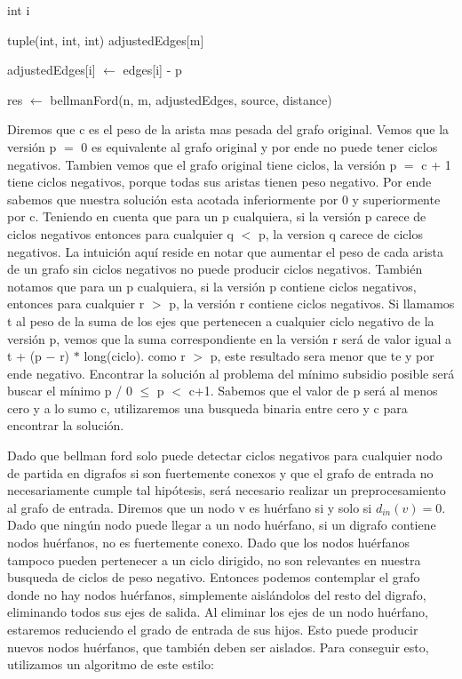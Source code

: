 \begin{algorithm}[H]
		\NoCaptionOfAlgo
		\caption{}
		
		int i
		
		tuple(int, int, int) adjustedEdges[m] 
		
		\For{i in [0..m)}
		{
			adjustedEdges[i] $\leftarrow$ edges[i] - p	
		}

		res $\leftarrow$ bellmanFord(n, m, adjustedEdges, source, distance)		

	\end{algorithm}

Diremos que c es el peso de la arista mas pesada del grafo original. Vemos que la versión p $=$ 0 es equivalente al grafo original y por ende no puede tener ciclos negativos. Tambien vemos que el grafo original tiene ciclos, la versión p $=$ c + 1 tiene ciclos negativos, porque todas sus aristas tienen peso negativo. Por ende sabemos que nuestra solución esta acotada inferiormente por 0 y superiormente por c. Teniendo en cuenta que para un p cualquiera, si la versión p carece de ciclos negativos entonces para cualquier q $<$ p, la version q carece de ciclos negativos. La intuición aquí reside en notar que aumentar el peso de cada arista de un grafo sin ciclos negativos no puede producir ciclos negativos. También notamos que para un p cualquiera, si la versión p contiene ciclos negativos, entonces para cualquier r $>$ p, la versión r contiene ciclos negativos. Si llamamos t al peso de la suma de los ejes que pertenecen a cualquier ciclo negativo de la versión p, vemos que la suma correspondiente en la versión r será de valor igual a t + (p $-$ r) $\ast$ long(ciclo). como r $>$ p, este resultado sera menor que te y por ende negativo. Encontrar la solución al problema del mínimo subsidio posible será buscar el mínimo p / 0 $\leq$ p $<$ c+1. Sabemos que el valor de p será al menos cero y a lo sumo c, utilizaremos una busqueda binaria entre cero y c para encontrar la solución.
\\
\par
Dado que bellman ford solo puede detectar ciclos negativos para cualquier nodo de partida en digrafos si son fuertemente conexos y que el grafo de entrada no necesariamente cumple tal hipótesis, será necesario realizar un preprocesamiento al grafo de entrada. Diremos que un nodo v es huérfano si y solo si $d_{in} (v) = 0$. Dado que ningún nodo puede llegar a un nodo huérfano, si un digrafo contiene nodos huérfanos, no es fuertemente conexo. Dado que los nodos huérfanos tampoco pueden pertenecer a un ciclo dirigido, no son relevantes en nuestra busqueda de ciclos de peso negativo. Entonces podemos contemplar el grafo donde no hay nodos huérfanos, simplemente aislándolos del resto del digrafo, eliminando todos sus ejes de salida. Al eliminar los ejes de un nodo huérfano, estaremos reduciendo el grado de entrada de sus hijos. Esto puede producir nuevos nodos huérfanos, que también deben ser aislados. Para conseguir esto, utilizamos un algoritmo de este estilo:
